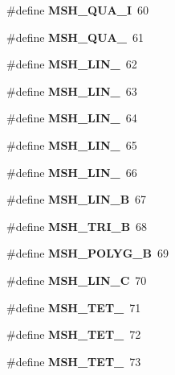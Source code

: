\begin{DoxyCompactItemize}
\item 
\#define {\bfseries M\-S\-H\-\_\-\-Q\-U\-A\-\_\-I}~60\label{GmshDefines_8h_af1407bfeaacf2caad7079ca277c8f7ee}

\item 
\#define {\bfseries M\-S\-H\-\_\-\-Q\-U\-A\-\_}~61\label{GmshDefines_8h_ae9d2ed4aaa5aed54a2df7d6f30fc6a0a}

\item 
\#define {\bfseries M\-S\-H\-\_\-\-L\-I\-N\-\_}~62\label{GmshDefines_8h_ac6634baf959c7c0ee1b7deeeb55975de}

\item 
\#define {\bfseries M\-S\-H\-\_\-\-L\-I\-N\-\_}~63\label{GmshDefines_8h_a9e8d3d472229cea2bb6093c51e296dd0}

\item 
\#define {\bfseries M\-S\-H\-\_\-\-L\-I\-N\-\_}~64\label{GmshDefines_8h_aa60bac65fe23cd75987b4d515b5a5651}

\item 
\#define {\bfseries M\-S\-H\-\_\-\-L\-I\-N\-\_}~65\label{GmshDefines_8h_a979152efb535146756d2dc4ce7f7f49a}

\item 
\#define {\bfseries M\-S\-H\-\_\-\-L\-I\-N\-\_}~66\label{GmshDefines_8h_a8c0ca780ae76f5c95540055cfcb44e72}

\item 
\#define {\bfseries M\-S\-H\-\_\-\-L\-I\-N\-\_\-\-B}~67\label{GmshDefines_8h_ab40f48f40e574a53d032d68df65e9708}

\item 
\#define {\bfseries M\-S\-H\-\_\-\-T\-R\-I\-\_\-\-B}~68\label{GmshDefines_8h_ac509ec60b00b067f0744fc9418b2c8c9}

\item 
\#define {\bfseries M\-S\-H\-\_\-\-P\-O\-L\-Y\-G\-\_\-\-B}~69\label{GmshDefines_8h_a30d5fe38b822e74aabb6bb1daa5f45ac}

\item 
\#define {\bfseries M\-S\-H\-\_\-\-L\-I\-N\-\_\-\-C}~70\label{GmshDefines_8h_ac3e0e003dc9ec6bc794b365b518f81f0}

\item 
\#define {\bfseries M\-S\-H\-\_\-\-T\-E\-T\-\_}~71\label{GmshDefines_8h_ab087bafa0d35a69ab9115ceadbb21dd8}

\item 
\#define {\bfseries M\-S\-H\-\_\-\-T\-E\-T\-\_}~72\label{GmshDefines_8h_a3cc07a0b6f716c39087d70a97c43e525}

\item 
\#define {\bfseries M\-S\-H\-\_\-\-T\-E\-T\-\_}~73\label{GmshDefines_8h_ad1d945a4c660247baca6b82286a81385}


\end{DoxyCompactItemize}
